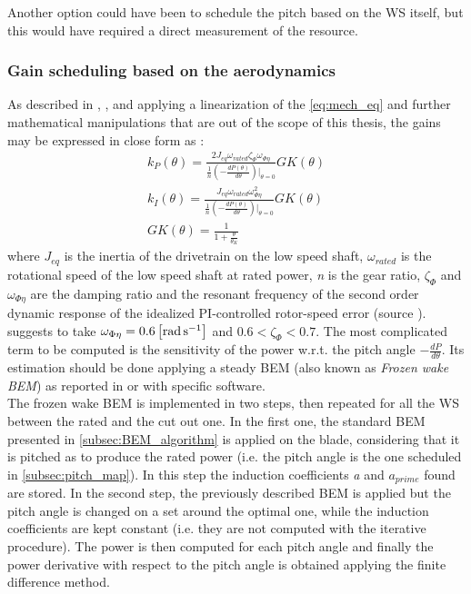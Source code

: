 Another option could have been to schedule the pitch based on the \acrshort{WS} itself, but this would have required a direct measurement of the resource. 
\subsubsection{Gain scheduling based on the aerodynamics}\label{subsec:gain_schdeuling_aero}

As described in \cite{Aerodynamics_of_wind_turbines}, \cite{NREL_5MW_reference}, and \cite{ris_r_1500} applying a linearization of the \autoref{eq:mech_eq} and further mathematical manipulations that are out of the scope of this thesis,  the gains may be expressed in close form as :
\begin{gather}
    k_P(\theta) = \frac{2J_{eq}\omega_{rated}\zeta_{\Phi}\omega_{\Phi\eta}}{\frac{1}{n}\left(-\frac{dP(\theta)}{d\theta}\right)\vert_{\theta=0}}GK(\theta)
    \label{eq:kp}\\
    k_I(\theta) = \frac{J_{eq}\omega_{rated}\omega_{\Phi\eta}^2}{\frac{1}{n}\left(-\frac{dP(\theta)}{d\theta}\right)\vert_{\theta=0}}GK(\theta)
    \label{eq:ki}\\
    GK(\theta) = \frac{1}{1+\frac{\theta}{\theta_K}} \label{eq:GK}
\end{gather}
where $J_{eq}$ is the inertia of the drivetrain on the low speed shaft, $\omega_{rated}$ is the rotational speed of the low speed shaft at rated power, \textit{n} is the gear ratio, $\zeta_{\Phi}$ and $\omega_{\Phi\eta}$ are the damping ratio and the resonant frequency of the second order dynamic response of the idealized PI-controlled rotor-speed error (source \cite{NREL_5MW_reference}). \cite{NREL_5MW_reference} suggests to take $\omega_{\Phi\eta}=0.6\left[\si{\radian\per\second}\right]$ and $0.6<\zeta_{\Phi}<0.7$. The most complicated term to be computed is the sensitivity of the power w.r.t. the pitch angle $-\frac{dP}{d\theta}$. Its estimation should be done applying a steady \acrshort{BEM} (also known as \textit{Frozen wake BEM}) as reported in \cite{Aerodynamics_of_wind_turbines} or with specific software. \\
The frozen wake BEM is implemented in two steps, then repeated for all the \acrshort{WS} between the rated and the cut out one. In the first one, the standard BEM presented in \autoref{subsec:BEM_algorithm} is applied on the blade, considering that it is pitched as to produce the rated power (i.e. the pitch angle is the one scheduled in \autoref{subsec:pitch_map}). In this step the induction coefficients \textit{a} and \textit{$a_{prime}$} found are stored. In the second step, the previously described BEM is applied but the pitch angle is changed on a set around the optimal one, while the induction coefficients are kept constant (i.e. they are not computed with the iterative procedure). The power is then computed for each pitch angle and finally the power derivative with respect to the pitch angle is obtained applying the finite difference method.

